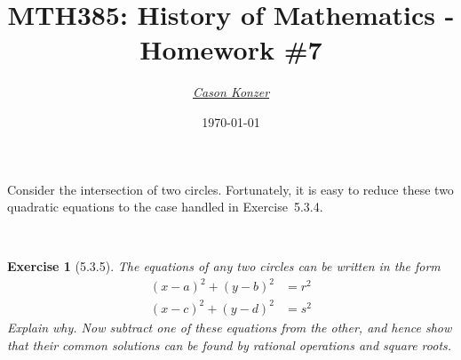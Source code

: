 \documentclass[12pt]{article}
\newcommand{\XB}{\color{black}}
\newcommand{\XBB}{\color{blue}}
\newcommand{\XV}{\color{violet}}
\theoremstyle{plain}
\newtheorem{ex}{Exercise}
\begin{document}
\title{\textbf{MTH385}: History of Mathematics - Homework \#7}
\date{\today}
\author{\XV\textit{\large{\href{https://github.com/casonk}{Cason Konzer}}}\XB}

\maketitle

\hrulefill

\newpage


Consider the intersection of two circles. Fortunately, it is easy to reduce these two quadratic equations to the case handled in Exercise~5.3.4.

\XBB\hrulefill\XB \\
\begin{ex} [5.3.5]
  The equations of any two circles can be written in the form
  \begin{align*}
    (x - a)^{2} + (y - b)^{2} &= r^{2} \\
    (x - c)^{2} + (y - d)^{2} &= s^{2}
  \end{align*}
  Explain why. Now subtract one of these equations from the other, and hence show that their common solutions can be found by rational operations and square roots.
\end{ex}
\XBB\hrulefill\XB \\
\end{document}
